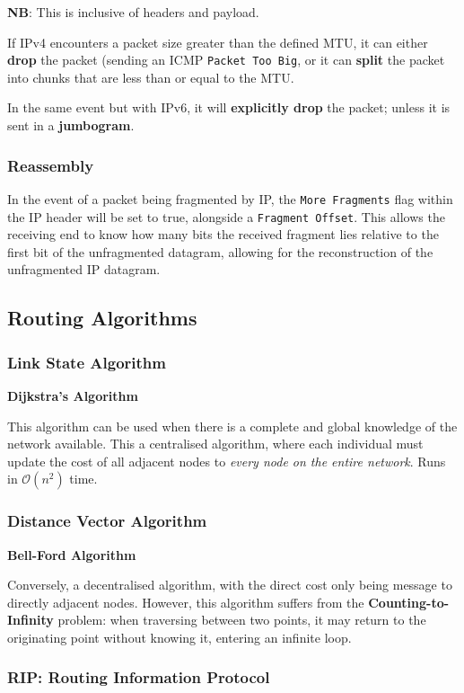 \documentclass{article}
\begin{document}
\textbf{NB}: This is inclusive of headers and payload.

If IPv4 encounters a packet size greater than the defined MTU, it can either \textbf{drop} the packet (sending an ICMP \texttt{Packet Too Big}, or it can \textbf{split} the packet into chunks that are less than or equal to the MTU.

In the same event but with IPv6, it will \textbf{explicitly drop} the packet; unless it is sent in a \textbf{jumbogram}.

\subsubsection{Reassembly}

In the event of a packet being fragmented by IP, the \texttt{More Fragments} flag within the IP header will be set to true, alongside a \texttt{Fragment Offset}. This allows the receiving end to know how many bits the received fragment lies relative to the first bit of the unfragmented datagram, allowing for the reconstruction of the unfragmented IP datagram.

\subsection{Routing Algorithms}
\subsubsection{Link State Algorithm}
\textbf{Dijkstra's Algorithm}

This algorithm can be used when there is a complete and global knowledge of the network available. This a centralised algorithm, where each individual must update the cost of all adjacent nodes to \textit{every node on the entire network}. Runs in $\mathcal{O}(n^2)$ time.

\subsubsection{Distance Vector Algorithm}
\textbf{Bell-Ford Algorithm}

Conversely, a decentralised algorithm, with the direct cost only being message to directly adjacent nodes. However, this algorithm suffers from the \textbf{Counting-to-Infinity} problem: when traversing between two points, it may return to the originating point without knowing it, entering an infinite loop.

\subsubsection{RIP: Routing Information Protocol}
\end{document}
